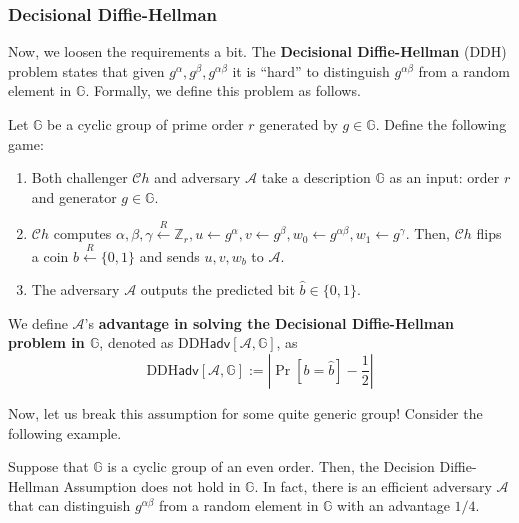 \documentclass[../lecture-notes.tex]{subfiles}
\begin{document}
\subsubsection{Decisional Diffie-Hellman}

Now, we loosen the requirements a bit. The \textbf{Decisional Diffie-Hellman} (DDH) problem states that given $g^{\alpha},g^{\beta},g^{\alpha\beta}$ it is ``hard'' to distinguish $g^{\alpha\beta}$ from a random element in $\mathbb{G}$. Formally, we define this problem as follows.

\begin{definition}
    Let $\mathbb{G}$ be a cyclic group of prime order $r$ generated by $g \in \mathbb{G}$. Define the following game:
    \begin{enumerate}
        \item Both challenger $\mathcal{C}h$ and adversary $\mathcal{A}$ take a description $\mathbb{G}$ as an input: order $r$ and generator $g \in \mathbb{G}$.
        \item $\mathcal{C}h$ computes $\alpha, \beta,\gamma \xleftarrow{R} \mathbb{Z}_r, u \gets g^{\alpha}, v \gets g^{\beta}, w_0 \gets g^{\alpha\beta}, w_1 \gets g^{\gamma}$. Then, $\mathcal{C}h$ flips a coin $b \xleftarrow{R} \{0,1\}$ and sends $u,v,w_b$ to $\mathcal{A}$.
        \item The adversary $\mathcal{A}$ outputs the predicted bit $\hat{b} \in \{0,1\}$.
    \end{enumerate}

    We define $\mathcal{A}$'s \textbf{advantage in solving the Decisional Diffie-Hellman problem in $\mathbb{G}$}, denoted as $\text{DDH}\mathsf{adv}[\mathcal{A},\mathbb{G}]$, as
    \begin{equation*}
        \text{DDH}\mathsf{adv}[\mathcal{A},\mathbb{G}] := \left| \Pr[b = \hat{b}] - \frac{1}{2} \right|
    \end{equation*}
\end{definition}

Now, let us break this assumption for some quite generic group! Consider the following example.

\begin{theorem}
    Suppose that $\mathbb{G}$ is a cyclic group of an even order. Then, the Decision
    Diffie-Hellman Assumption does not hold in $\mathbb{G}$. In fact, there is an efficient adversary $\mathcal{A}$ that can distinguish $g^{\alpha\beta}$ from a random element in $\mathbb{G}$ with an advantage $1/4$.
\end{theorem}
\end{document}
